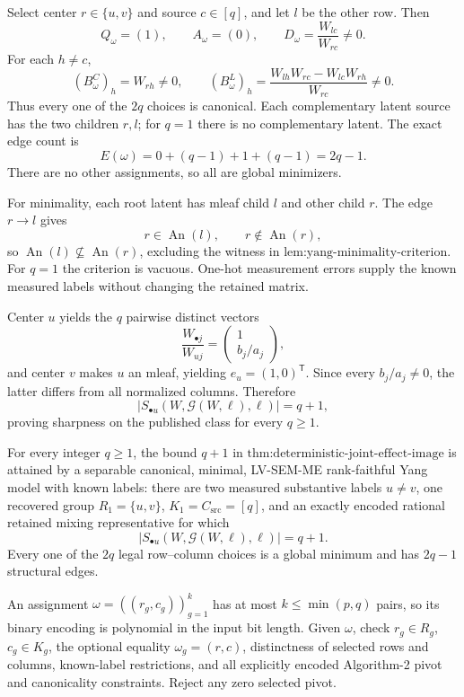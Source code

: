 Select center \(r\in\{u,v\}\) and source \(c\in[q]\), and let \(l\) be the other row. Then
\[
Q_\omega=(1),\qquad A_\omega=(0),\qquad D_\omega=\frac{W_{lc}}{W_{rc}}\ne0.
\]
For each \(h\ne c\),
\[
(B^C_\omega)_h=W_{rh}\ne0,
\qquad
(B^L_\omega)_h
=\frac{W_{lh}W_{rc}-W_{lc}W_{rh}}{W_{rc}}\ne0.
\]
Thus every one of the \(2q\) choices is canonical. Each complementary latent source has the two children \(r,l\); for \(q=1\) there is no complementary latent. The exact edge count is
\[
E(\omega)=0+(q-1)+1+(q-1)=2q-1.
\]
There are no other assignments, so all are global minimizers.

For minimality, each root latent has mleaf child \(l\) and other child \(r\). The edge \(r\to l\) gives
\[
r\in\operatorname{An}(l),\qquad r\notin\operatorname{An}(r),
\]
so \(\operatorname{An}(l)\nsubseteq\operatorname{An}(r)\), excluding the witness in \(\text{lem:yang-minimality-criterion}\). For \(q=1\) the criterion is vacuous. One-hot measurement errors supply the known measured labels without changing the retained matrix.

Center \(u\) yields the \(q\) pairwise distinct vectors
\[
\frac{W_{\bullet j}}{W_{uj}}=\begin{pmatrix}1\\b_j/a_j\end{pmatrix},
\]
and center \(v\) makes \(u\) an mleaf, yielding \(e_u=(1,0)^{\mathsf T}\). Since every \(b_j/a_j\ne0\), the latter differs from all normalized columns. Therefore
\[
|S_{\bullet u}(W,\mathcal G(W,\ell),\ell)|=q+1,
\]
proving sharpness on the published class for every \(q\ge1\).

For every integer \(q\ge1\), the bound \(q+1\) in \(\text{thm:deterministic-joint-effect-image}\) is attained by a separable canonical, minimal, LV-SEM-ME rank-faithful Yang model with known labels: there are two measured substantive labels \(u\ne v\), one recovered group \(R_1=\{u,v\}\), \(K_1=C_{\mathrm{src}}=[q]\), and an exactly encoded rational retained mixing representative for which
\[
|S_{\bullet u}(W,\mathcal G(W,\ell),\ell)|=q+1.
\]
Every one of the \(2q\) legal row--column choices is a global minimum and has \(2q-1\) structural edges.

An assignment \(\omega=((r_g,c_g))_{g=1}^{k}\) has at most \(k\le\min(p,q)\) pairs, so its binary encoding is polynomial in the input bit length. Given \(\omega\), check \(r_g\in R_g\), \(c_g\in K_g\), the optional equality \(\omega_g=(r,c)\), distinctness of selected rows and columns, known-label restrictions, and all explicitly encoded Algorithm-2 pivot and canonicality constraints. Reject any zero selected pivot.

